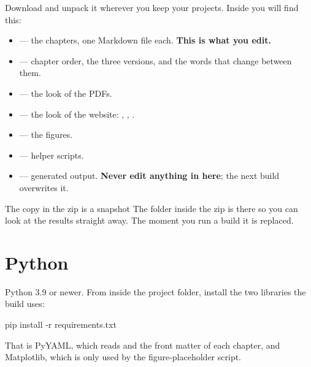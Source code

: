 \documentclass{symbulator}
\begin{document}
\maketitlepage
\tableofcontents


Download  and unpack it wherever you keep your
projects. Inside you will find this:

\begin{itemize}
\item {} --- the chapters, one Markdown file each. \textbf{This is
      what you edit.}
\item {} --- chapter order, the three versions, and the words
      that change between them.
\item {} --- the look of the PDFs.
\item {} --- the look of the website: ,
      , .
\item {} --- the figures.
\item {} --- helper scripts.
\item {} --- generated output. \textbf{Never edit anything in
      here}; the next build overwrites it.
\end{itemize}

\begin{calloutwarning}{The copy in the zip is a snapshot}
The  folder inside the zip is there so you can look at the
results straight away. The moment you run a build it is replaced.
\end{calloutwarning}


\section{Python}

Python 3.9 or newer. From inside the project folder, install the two libraries
the build uses:

\begin{symtype}
pip install -r requirements.txt
\end{symtype}

That is PyYAML, which reads  and the front matter of each
chapter, and Matplotlib, which is only used by the figure-placeholder script.
\end{document}
